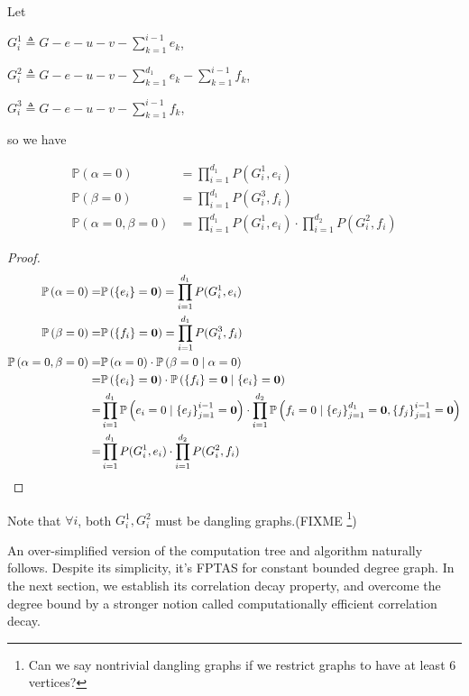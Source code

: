 Let

$G_i^1 \triangleq G - e - u - v - \sum_{k=1}^{i-1} e_k$,

$G_i^2 \triangleq G-e-u-v - \sum_{k=1}^{d_1}e_k - \sum_{k=1}^{i-1} f_k$,

$G_i^3 \triangleq G - e - u - v - \sum_{k=1}^{i-1} f_k$,

so we have

\begin{Prop}
	\begin{align*}
		\mathbb{P}\left( \alpha = 0\right) &= \prod_{i=1}^{d_1} P(G_i^1, e_i) \\
		\mathbb{P}\left( \beta = 0\right) &= \prod_{i=1}^{d_1} P(G_i^3, f_i) \\
		\mathbb{P}\left( \alpha = 0, \beta = 0 \right) &= \prod_{i=1}^{d_1} P(G_i^1, e_i) \cdot \prod_{i=1}^{d_2} P(G_i^2, f_i) 
	\end{align*}
\end{Prop}

\begin{proof}
	\begin{align*}
		\mathbb{P}\left( \alpha = 0\right) =&\mathbb{P} \left( \left\{e_i\right\} = \mathbf{0}\right) =	\prod_{i=1}^{d_1} P(G_i^1, e_i) \\
		\mathbb{P}\left( \beta = 0\right) =&\mathbb{P} \left( \left\{f_i\right\} = \mathbf{0}\right) =	\prod_{i=1}^{d_1} P(G_i^3, f_i) \\
		\mathbb{P}\left( \alpha = 0, \beta = 0 \right) =& \mathbb{P} \left( \alpha = 0 \right) \cdot \mathbb{P}\left( \beta = 0 \mid \alpha = 0 \right) \\
		=& \mathbb{P} \left( \left\{e_i\right\} = \mathbf{0}\right) \cdot \mathbb{P} \left( \left\{f_i\right\} = \mathbf{0} \mid \left\{e_i\right\} = \mathbf{0} \right) \\
=&\prod_{i=1}^{d_1} \mathbb{P} \left( e_i = 0 \mid \left\{e_j\right\}_{j=1}^{i-1} = \mathbf{0} \right) \cdot \prod_{i=1}^{d_2} \mathbb{P} \left( f_i = 0 \mid \left\{e_j\right\}_{j=1}^{d_1} = \mathbf{0},\left\{f_j\right\}_{j=1}^{i-1} = \mathbf{0} \right) \\
=& \prod_{i=1}^{d_1} P(G_i^1, e_i) \cdot \prod_{i=1}^{d_2} P(G_i^2, f_i) 
	\end{align*}
\end{proof}

Note that $\forall i$, both $G_i^1, G_i^2$ must be dangling graphs.(FIXME \footnote{ Can we say nontrivial dangling graphs if we restrict graphs to have at least 6 vertices?})

An over-simplified version of the computation tree and algorithm naturally follows. Despite its simplicity, it's FPTAS for constant bounded degree graph. In the next section, we establish its correlation decay property, and overcome the degree bound by a stronger notion called computationally efficient correlation decay.

